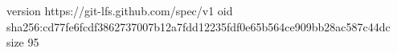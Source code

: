 version https://git-lfs.github.com/spec/v1
oid sha256:cd77fe6fcdf3862737007b12a7fdd12235fdf0e65b564ce909bb28ac587c44dc
size 95
